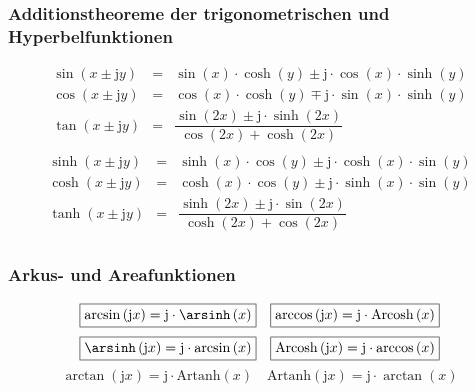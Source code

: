 \subsubsection{Additionstheoreme der trigonometrischen und Hyperbelfunktionen}
\begin{equation}
\boxed{\begin{array}{lll}
\sin\left(x\pm \text{j}y\right)&=&\sin\left(x\right)\cdot \cosh\left(y\right)\pm \text{j}\cdot \cos\left(x\right)\cdot \sinh\left(y\right)\\
\cos\left(x\pm \text{j}y\right)&=&\cos\left(x\right)\cdot \cosh\left(y\right)\mp \text{j}\cdot \sin\left(x\right)\cdot \sinh\left(y\right)\\
\tan\left(x\pm \text{j}y\right)&=&\dfrac{\sin\left(2x\right)\pm \text{j}\cdot \sinh\left(2x\right)}{\cos\left(2x\right)+\cosh\left(2x\right)}\\
\end{array}}
\end{equation}
\begin{equation}
\boxed{\begin{array}{lll}
\sinh\left(x\pm \text{j}y\right)&=&\sinh\left(x\right)\cdot \cos\left(y\right)\pm \text{j}\cdot \cosh\left(x\right)\cdot \sin\left(y\right)\\
\cosh\left(x\pm \text{j}y\right)&=&\cosh\left(x\right)\cdot \cos\left(y\right)\pm \text{j}\cdot \sinh\left(x\right)\cdot \sin\left(y\right)\\
\tanh\left(x\pm \text{j}y\right)&=&\dfrac{\sinh\left(2x\right)\pm \text{j}\cdot \sin\left(2x\right)}{\cosh\left(2x\right)+\cos\left(2x\right)}\\
\end{array}}
\end{equation}
\subsubsection{Arkus- und Areafunktionen}
\begin{equation}
\boxed{\arcsin\left(\text{j}x\right)=\text{j}\cdot \arsinh\left(x\right)}\quad \boxed{\arccos\left(\text{j}x\right)=\text{j}\cdot \text{Arcosh}\left(x\right)}
\end{equation}
\begin{equation}
\boxed{\arsinh\left(\text{j}x\right)=\text{j}\cdot \arcsin\left(x\right)}\quad \boxed{\text{Arcosh}\left(\text{j}x\right)=\text{j}\cdot \arccos\left(x\right)}
\end{equation}
\begin{equation}
\boxed{\arctan\left(\text{j}x\right)=\text{j}\cdot \text{Artanh}\left(x\right)}\quad \boxed{\text{Artanh}\left(\text{j}x\right)=\text{j}\cdot \arctan\left(x\right)}
\end{equation}

